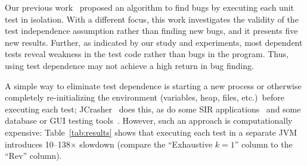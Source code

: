Our previous work~\cite{DBLP:conf/sigsoft/MusluSW11} proposed
an algorithm to find bugs by executing each unit
test in isolation. With a different focus,
this work investigates the validity of the test independence assumption
rather than finding new bugs,
and it presents five new results.
Further, as indicated by our study and experiments, most dependent
tests reveal weakness in the test code rather than bugs in the program. Thus,
using test dependence may not achieve a high return in bug finding.

A simple way to eliminate test dependence is
starting a new process or otherwise completely re-initializing the environment (variables,
heap, files, etc.)\ before executing each test;
JCrasher~\cite{Csallner:2004} does this, as do
some SIR applications~\cite{sir} and
some database or GUI testing tools~\cite{kapfhammeretal:FSE:2003,
Chays:2000:FTD:347324.348954, Gray:1994:QGB:191843.191886
}.
However, such an approach is computationally expensive:
Table~\ref{tab:results} shows that executing each test in a
separate JVM introduces 10--138$\times$ slowdown (compare the 
``Exhaustive $k=1$'' column to the ``Rev'' column).





